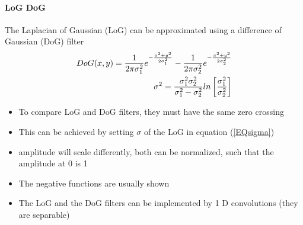 \paragraph{LoG DoG}
The Laplacian of Gaussian (LoG) can be approximated using a difference of Gaussian (DoG) filter
\begin{align}
DoG(x,y)=\frac{1}{2\pi\sigma_1^2}e^{-\frac{x^2+y^2}{2\sigma_1^2}}-\frac{1}{2\pi\sigma_2^2}e^{-\frac{x^2+y^2}{2\sigma_2^2}}\notag\\
\sigma^2=\frac{\sigma_1^2\sigma_2^2}{\sigma_1^2-\sigma_2^2}ln\left[\frac{\sigma_1^2}{\sigma_2^2}\right]\label{EQsigma}
\end{align}
\begin{itemize}
\item To compare LoG and DoG filters, they must have the same zero crossing
\item This can be achieved by setting $\sigma$ of the LoG in equation (\ref{EQsigma})
\item amplitude will scale differently, both can be normalized, such that the amplitude at 0 is 1
\item The negative functions are usually shown
\item The LoG and the DoG filters can be implemented by 1 D convolutions (they are separable)
\end{itemize}


